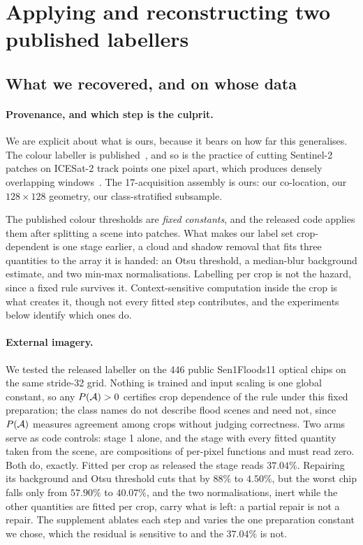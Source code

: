 \section{Applying and reconstructing two published labellers}
\label{sec:wild}

\subsection{What we recovered, and on whose data}
\label{sec:recovery}

\paragraph{Provenance, and which step is the culprit.} We are explicit about what is
ours, because it bears on how far this generalises. The colour labeller is
published~\cite{iqrah2023polar,iqrah2024parallel}, and so is the practice of cutting
Sentinel-2 patches on ICESat-2 track points one pixel apart, which produces densely
overlapping windows~\cite{lechamo2025multimodal}. The 17-acquisition assembly is ours:
our co-location, our $128 \times 128$ geometry, our class-stratified subsample.

The published colour thresholds are \emph{fixed constants}, and the released code
applies them after splitting a scene into patches. What makes our label set
crop-dependent is one stage earlier, a cloud and shadow removal that fits three
quantities to the array it is handed: an Otsu threshold, a median-blur background
estimate, and two min-max normalisations. Labelling per crop is not the hazard, since
a fixed rule survives it. Context-sensitive computation inside the crop is what
creates it, though not every
fitted step contributes, and the experiments below identify which ones do.

\paragraph{External imagery.} We tested the released labeller on the 446
public Sen1Floods11 optical chips on the same stride-32 grid. Nothing is trained and
input scaling is one global constant, so any $P(\mathcal{A}) > 0$ certifies crop dependence
of the rule under this fixed preparation; the class names do not describe flood scenes and need not,
since $P(\mathcal{A})$ measures agreement among crops without judging correctness. Two arms
serve as code controls: stage 1 alone, and the
stage with every fitted quantity taken from the scene, are compositions of per-pixel
functions and must read zero. Both do, exactly. Fitted per crop as released the stage
reads $37.04\%$. Repairing its background and Otsu threshold cuts that by $88\%$ to
$4.50\%$, but the worst chip falls only from $57.90\%$ to $40.07\%$, and the two
normalisations, inert while the other quantities are fitted per crop, carry what is
left: a partial repair is not a repair. The supplement ablates each step and varies
the one preparation constant we chose, which the residual is sensitive to and the
$37.04\%$ is not.

